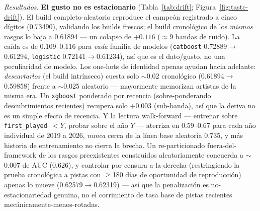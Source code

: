 \documentclass[11pt]{article}
\begin{document}
\emph{Resultados.} \textbf{El gusto no es estacionario} (Tabla~\ref{tab:drift};
Figura~\ref{fig:taste-drift}). El build completo-aleatorio reproduce el campeón
registrado a cinco dígitos (\num{0.73490}), validando los builds frescos; el build
cronológico de los \emph{mismos} rasgos lo baja a \num{0.61894} --- un colapso de
$+\num{0.116}$ ($\approx$9 bandas de ruido). La caída es de \num{0.109}--\num{0.116}
para \emph{cada} familia de modelos (\texttt{catboost} \num{0.72889}$\to$%
\num{0.61294}, \texttt{logistic} \num{0.72141}$\to$\num{0.61234}), así que es el
dato/gusto, no una peculiaridad de modelo. Los one-hots de identidad apenas ayudan
hacia adelante: \emph{descartarlos} (el build intrínseco) cuesta solo $\sim$0.02
cronológico (\num{0.61894}$\to$\num{0.59858}) frente a $\sim$0.025 aleatorio ---
mayormente memorizan artistas de la misma era. Un \texttt{xgboost} ponderado por
recencia (sobre-ponderando descubrimientos recientes) recupera solo $+\num{0.003}$
(sub-banda), así que la deriva no es un simple efecto de recencia. Y la lectura
walk-forward --- entrenar sobre \texttt{first\_played}~$<Y$, probar sobre el año
$Y$ --- aterriza en \num{0.59}--\num{0.67} para cada año individual de 2019 a 2026,
\emph{nunca} cerca de la línea base aleatoria \num{0.735}, y más historia de
entrenamiento no cierra la brecha. Un re-particionado fuera-del-framework de los
rasgos preexistentes construidos aleatoriamente concuerda a $\sim$0.007 de AUC
(\num{0.626}), y controlar por censura-a-la-derecha (restringiendo la prueba
cronológica a pistas con $\ge$180 días de oportunidad de reproducción) apenas lo
mueve (\num{0.62579}$\to$\num{0.62319}) --- así que la penalización es
no-estacionariedad genuina, no el corrimiento de tasa base de pistas recientes
mecánicamente-menos-rotadas.
\end{document}
